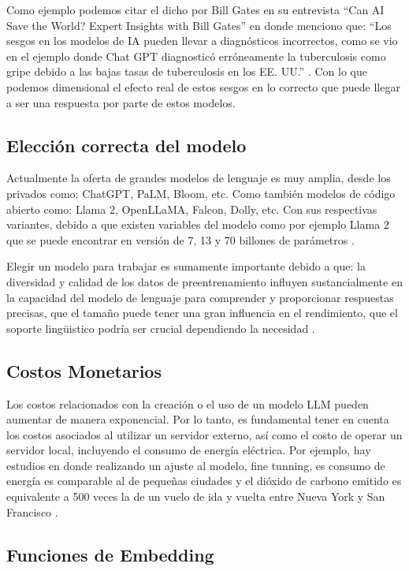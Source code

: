 Como ejemplo podemos citar el dicho por Bill Gates en su entrevista ``Can AI Save the World? Expert Insights with Bill Gates''  en donde menciono que: 
``Los sesgos en los modelos de IA pueden llevar a diagnósticos incorrectos, como se vio en el ejemplo donde Chat GPT diagnosticó erróneamente la 
tuberculosis como gripe debido a las bajas tasas de tuberculosis en los EE. UU.'' \cite{billgates1}. Con lo que podemos dimensional el efecto real de estos sesgos 
en lo correcto que puede llegar a ser una respuesta por parte de estos modelos.

\subsection{Elección correcta del modelo}
Actualmente la oferta de grandes modelos de lenguaje es muy amplia, desde los privados como: ChatGPT, PaLM, Bloom, etc. 
Como también modelos de código abierto como: Llama 2, OpenLLaMA, Falcon, Dolly, etc. \cite{modelo2} Con sus respectivas variantes, debido a que existen 
variables del modelo como por ejemplo Llama 2 que se puede encontrar en versión de 7, 13 y 70 billones de parámetros \cite{modelos3}. 

Elegir un modelo para trabajar es sumamente importante debido a que: la diversidad y calidad de los datos de preentrenamiento influyen 
sustancialmente en la capacidad del modelo de lenguaje para comprender y proporcionar respuestas precisas, que el tamaño puede tener una 
gran influencia en el rendimiento, que el soporte lingüistico podría ser crucial dependiendo la necesidad \cite{modelos1}.


\subsection{Costos Monetarios}
Los costos relacionados con la creación o el uso de un modelo LLM pueden aumentar de manera exponencial. Por lo tanto, es fundamental tener en 
cuenta los costos asociados al utilizar un servidor externo, así como el costo de operar un servidor local, incluyendo el consumo de energía eléctrica.
Por ejemplo, hay estudios en donde realizando un ajuste al modelo, fine tunning, es consumo de energía es comparable al de pequeñas ciudades y el dióxido 
de carbono emitido es equivalente a 500 veces la de un vuelo de ida y vuelta entre Nueva York y San Francisco \cite{ft1}. 


\subsection{Funciones de Embedding}

